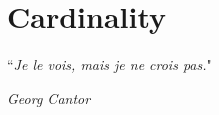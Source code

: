 \chapter{Cardinality}

\epigraph{``\textit{Je le vois, mais je ne crois pas.}"}{\textit{Georg Cantor}}